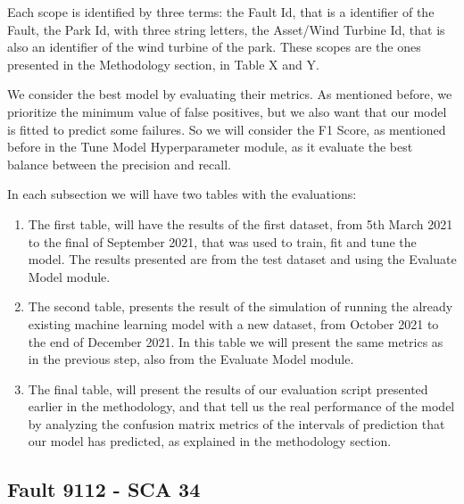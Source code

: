 Each scope is identified by three terms: the Fault Id, that is a identifier of the Fault, the Park Id, with three string letters, the Asset/Wind Turbine Id, that is also an identifier of the wind turbine of the park. These scopes are the ones presented in the Methodology section, in Table X and Y.


We consider the best model by evaluating their metrics. As mentioned before, we prioritize the minimum value of false positives, but we also want that our model is fitted to predict some failures.
So we will consider the F1 Score, as mentioned before in the Tune Model Hyperparameter module, as it evaluate the best balance between the precision and recall.

In each subsection we will have two tables with the evaluations:
\begin{enumerate}
    \item 
The first table, will have the results of the first dataset, from 5th March 2021 to the final of September 2021, that was used to train, fit and tune the model. The results presented are from the test dataset and using the Evaluate Model module.
    \item
The second table, presents the result of the simulation of running the already existing machine learning model with a new dataset, from October 2021 to the end of December 2021. In this table we will present the same metrics as in the previous step, also from the Evaluate Model module.
    \item
The final table, will present the results of our evaluation script presented earlier in the methodology, and that tell us the real performance of the model by analyzing the confusion matrix metrics of the intervals of prediction that our model has predicted, as explained in the methodology section.
\end{enumerate}



\subsection{Fault 9112 - SCA 34}

